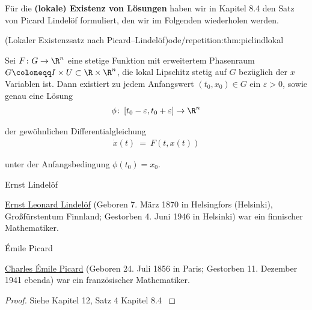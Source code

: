 \documentclass[letterpaper,10pt,english]{jupyterBook}
\begin{document}
\par
Für die \textbf{(lokale) Existenz von Lösungen} haben wir in Kapitel 8.4 \cite{Ten21} den Satz von Picard Lindelöf formuliert, den wir im Folgenden wiederholen werden.
\begin{theorem}{(Lokaler Existenzsatz nach Picard–Lindelöf)}{ode/repetition:thm:piclindlokal}



\par
Sei \(F\colon G\to\R^n\) eine stetige Funktion mit erweitertem Phasenraum \(G \coloneqq I \times U \subset \R\times\R^n\), die lokal Lipschitz stetig auf \(G\) bezüglich der \(x\) Variablen ist.
Dann existiert zu jedem Anfangswert \((t_0,x_0) \in G\) ein \(\varepsilon>0\), sowie genau eine Lösung
\begin{align*}
\phi \colon \left[t_0-\varepsilon, t_0+\varepsilon\right] \to \R^n
\end{align*}
\par
der gewöhnlichen Differentialgleichung
\begin{align*}
\dot{x}(t) \ = \ F(t,x(t))
\end{align*}
\par
unter der Anfangsbedingung \(\phi(t_0)=x_0\).
\end{theorem}

\begin{emphBox}{Ernst Lindelöf}{}

\par
\href{https://en.wikipedia.org/wiki/Ernst\_Leonard\_Lindel\%C3\%B6f}{Ernst Leonard Lindelöf} (Geboren 7. März 1870 in Helsingfors (Helsinki), Großfürstentum Finnland; Gestorben 4. Juni 1946 in Helsinki) war ein finnischer Mathematiker.
\end{emphBox}

\begin{emphBox}{Émile Picard}{}

\par
\href{https://de.wikipedia.org/wiki/\%C3\%89mile\_Picard}{Charles Émile Picard} (Geboren 24. Juli 1856 in Paris; Gestorben 11. Dezember 1941 ebenda) war ein französischer Mathematiker.
\end{emphBox}

\begin{proof}
 Siehe Kapitel 12, Satz 4 Kapitel 8.4 \cite{For17}
\end{proof}
\end{document}
